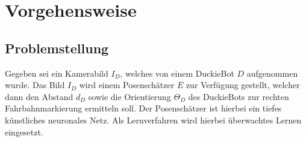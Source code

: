 
\chapter{Vorgehensweise}

\section{Problemstellung}

Gegeben sei ein Kamerabild $I_D$, welches von einem DuckieBot $D$ aufgenommen wurde. Das Bild $I_D$ wird einem Posenschätzer $E$ zur Verfügung gestellt, welcher dann den Abstand $d_D$ sowie die Orientierung $\Theta_D$ des DuckieBots zur rechten 
Fahrbahnmarkierung ermitteln soll. Der Posenschätzer ist hierbei ein tiefes künstliches neuronales Netz. Als Lernverfahren wird hierbei überwachtes Lernen eingesetzt.
